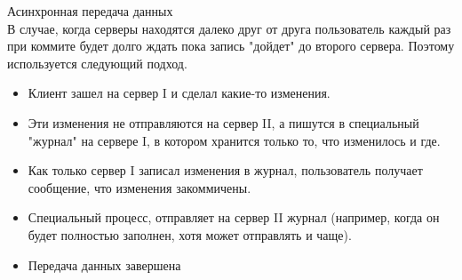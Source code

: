 Асинхронная передача данных \\
В случае, когда серверы находятся далеко друг от друга пользователь каждый раз при коммите будет долго ждать пока запись "дойдет" до второго сервера. Поэтому используется следующий подход. 
\begin {itemize}
\item Клиент зашел на сервер I и сделал какие-то изменения.
\item Эти изменения не отправляются на сервер II, а пишутся в специальный "журнал" на сервере I, в котором хранится только то, что изменилось и где. 
\item Как только сервер I записал изменения в журнал, пользователь получает сообщение, что изменения закоммичены. 
\item Специальный процесс, отправляет на сервер II журнал (например, когда он будет полностью заполнен, хотя может отправлять и чаще). \item Передача данных завершена 
\end {itemize}